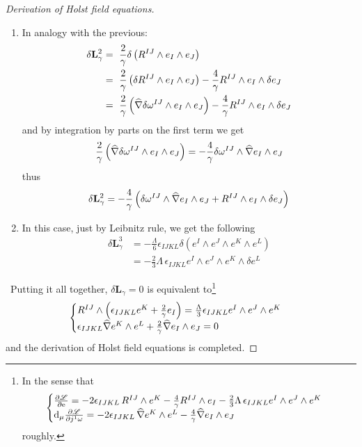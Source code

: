 \begin{proof}[Derivation of Holst field equations]
\begin{enumerate}
   \item In analogy with the previous:
   \begin{align*}
       \delta\mathbf{L}^2_\gamma&=\,\,\frac{2}{\gamma}\delta\left(R^{IJ}\wedge e_I\wedge e_J\right)\\
       &=\,\,\frac{2}{\gamma}\left(\delta R^{IJ}\wedge e_I\wedge e_J\right)-\frac{4}{\gamma}R^{IJ}\wedge e_I\wedge\delta e_J\\
       &=\,\,\frac{2}{\gamma}\left(\widehat{\nabla}\delta\omega^{IJ}\wedge e_I\wedge e_J\right)-\frac{4}{\gamma}R^{IJ}\wedge e_I\wedge\delta e_J
   \end{align*}
    and by integration by parts on the first term we get
    $$\frac{2}{\gamma}\left(\nablaw\delta\omega^{IJ}\wedge e_I\wedge e_J\right)=-\frac{4}{\gamma}\delta\omega^{IJ}\wedge\nablaw e_I\wedge e_J$$
    thus
    $$\delta\mathbf{L}^2_\gamma=-\frac{4}{\gamma}\left(\delta\omega^{IJ}\wedge\nablaw e_I\wedge e_J+R^{IJ}\wedge e_I\wedge\delta e_J\right)$$
    \item In this case, just by Leibnitz rule, we get the following
    \begin{align*}
        \delta\mathbf{L}^3_\gamma&=-\frac{\Lambda}{6}\epsilon_{IJKL}\delta\left(e^I\wedge e^J\wedge e^K\wedge e^L\right)\\
        &=-\frac{2}{3}\Lambda\,\epsilon_{IJKL}e^I\wedge e^J\wedge e^K\wedge\delta e^L
    \end{align*}
   \end{enumerate}
\,\newline
Putting it all together, $\delta\mathbf{L}_\gamma=0$ is equivalent to\footnote{In the sense that
$$\begin{cases}
    \frac{\der\L}{\der\e}=-2\epsilon_{IJKL}\,R^{IJ}\wedge e^K-\frac{4}{\gamma}R^{IJ}\wedge e_I-\frac{2}{3}\Lambda\,\epsilon_{IJKL}e^I\wedge e^J\wedge e^K\\
    \d_\mu\frac{\der\L}{\der j^1\omega}=-2\epsilon_{IJKL}\,\nablaw e^K\wedge e^L-\frac{4}{\gamma}\nablaw e_I\wedge e_J
\end{cases}$$
roughly.}
$$\begin{cases}
    R^{IJ}\wedge\left(\epsilon_{IJKL}e^K+\frac{2}{\gamma}e_I\right)=\frac{\Lambda}{3}\epsilon_{IJKL}e^I\wedge e^J\wedge e^K\\
    \epsilon_{IJKL}\nablaw e^K\wedge e^L+\frac{2}{\gamma}\nablaw e_I\wedge e_J=0
    
\end{cases}$$
and the derivation of Holst field equations is completed.


   
\end{proof}

